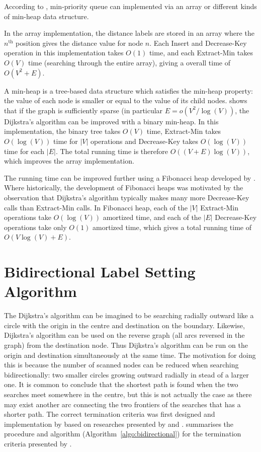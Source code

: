 According to \citet{Cormen},
min-priority queue can implemented via an array or different kinds of min-heap data structure.

In the array implementation,
the distance labels are stored in an array where the $n^{\text{th}}$ position gives the distance value for node $n$.
Each Insert and Decrease-Key operation in this implementation takes $O(1)$ time, and each Extract-Min takes $O(V)$ time (searching through the entire array), giving a overall time of $O(V^2 + E)$.

A min-heap is a tree-based data structure which satisfies the min-heap property:
the value of each node is smaller or equal to the value of its child nodes.
\citet{Cormen} shows that if the graph is sufficiently sparse (in particular $E = o(V^2/\log(V))$, the Dijkstra's algorithm can be improved with a binary min-heap. In this implementation, the binary tree takes $O(V)$ time, Extract-Min takes $O(\log(V))$ time for $|V|$ operations and Decrease-Key takes $O(\log(V))$ time for each $|E|$. The total running time is therefore $O((V+E)\log(V))$, which improves the array implementation.

The running time can be improved further using a Fibonacci heap
developed by \citet{Fredman}.
Where historically, the development of Fibonacci heaps was motivated by the observation that Dijkstra's algorithm typically makes many more Decrease-Key calls than Extract-Min calls.
In Fibonacci heap, each of the $|V|$ Extract-Min operations take $O(\log(V))$ amortized time,
and each of the $|E|$ Decrease-Key operations take only $O(1)$ amortized time,
which gives a total running time of $O(V\log(V)+E)$.

\section{Bidirectional Label Setting Algorithm} \label{section:bidirectional}
The Dijkstra's algorithm can be imagined to be searching radially outward like a circle with the origin in the centre and destination on the boundary.
Likewise, Dijkstra's algorithm can be used on the reverse graph (all arcs reversed in the graph) from the destination node.
Thus Dijkstra's algorithm can be run on the origin and destination simultaneously at the same time.
The motivation for doing this is because the number of scanned nodes can be reduced when searching bidirectionally:
two smaller circles growing outward radially in stead of a larger one.
It is common to conclude that the shortest path is found when the two searches meet somewhere in the centre,
but this is not actually the case as there may exist another arc connecting the two frontiers of the searches that has a shorter path.
The correct termination criteria was first designed and implementation by \citet{Pohl} based on researches presented by \citet{Dantzig, Nicholson} and \citet{Dreyfus}.
\citet{Klunder} summarises the procedure and algorithm (Algorithm~\ref{algo:bidirectional}) for the termination criteria presented by \citet{Pohl}.


